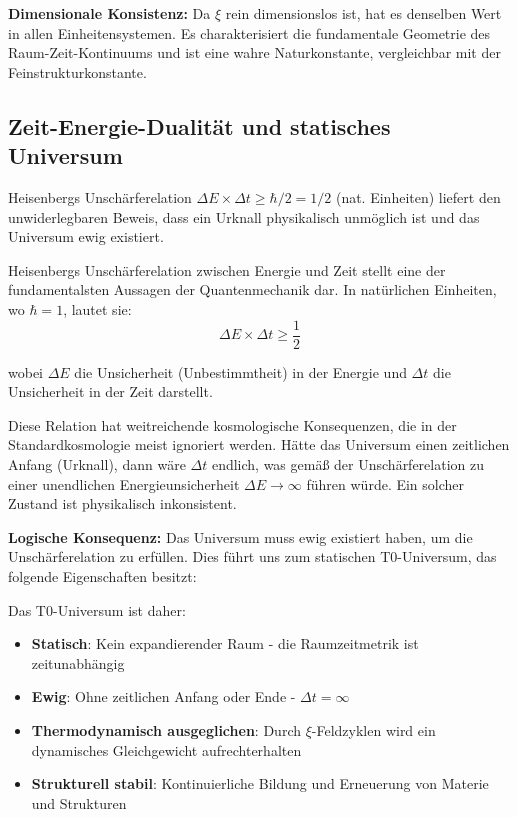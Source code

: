 	\textbf{Dimensionale Konsistenz:} Da $\xi$ rein dimensionslos ist, hat es denselben Wert in allen Einheitensystemen. Es charakterisiert die fundamentale Geometrie des Raum-Zeit-Kontinuums und ist eine wahre Naturkonstante, vergleichbar mit der Feinstrukturkonstante.
	
	\subsection{Zeit-Energie-Dualität und statisches Universum}
	
	\begin{important}
		Heisenbergs Unschärferelation $\Delta E \times \Delta t \geq \hbar/2 = 1/2$ (nat. Einheiten) liefert den unwiderlegbaren Beweis, dass ein Urknall physikalisch unmöglich ist und das Universum ewig existiert.
	\end{important}
	
	Heisenbergs Unschärferelation zwischen Energie und Zeit stellt eine der fundamentalsten Aussagen der Quantenmechanik dar. In natürlichen Einheiten, wo $\hbar = 1$, lautet sie:
	\begin{equation}
		\Delta E \times \Delta t \geq \frac{1}{2}
	\end{equation}
	
	wobei $\Delta E$ die Unsicherheit (Unbestimmtheit) in der Energie und $\Delta t$ die Unsicherheit in der Zeit darstellt.
	
	Diese Relation hat weitreichende kosmologische Konsequenzen, die in der Standardkosmologie meist ignoriert werden. Hätte das Universum einen zeitlichen Anfang (Urknall), dann wäre $\Delta t$ endlich, was gemäß{} der Unschärferelation zu einer unendlichen Energieunsicherheit $\Delta E \to \infty$ führen würde. Ein solcher Zustand ist physikalisch inkonsistent.
	
	\textbf{Logische Konsequenz:} Das Universum muss ewig existiert haben, um die Unschärferelation zu erfüllen. Dies führt uns zum statischen T0-Universum, das folgende Eigenschaften besitzt:
	
	Das T0-Universum ist daher:
	\begin{itemize}
		\item \textbf{Statisch}: Kein expandierender Raum - die Raumzeitmetrik ist zeitunabhängig
		\item \textbf{Ewig}: Ohne zeitlichen Anfang oder Ende - $\Delta t = \infty$
		\item \textbf{Thermodynamisch ausgeglichen}: Durch $\xi$-Feldzyklen wird ein dynamisches Gleichgewicht aufrechterhalten
		\item \textbf{Strukturell stabil}: Kontinuierliche Bildung und Erneuerung von Materie und Strukturen
	\end{itemize}
	
